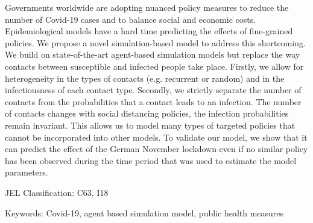 \noindent Governments worldwide are adopting nuanced policy measures to reduce the
number of Covid-19 cases and to balance social and economic costs. Epidemiological
models have a hard time predicting the effects of fine-grained policies. We propose a
novel simulation-based model to address this shortcoming. We build on state-of-the-art
agent-based simulation models but replace the way contacts between susceptible and
infected people take place. Firstly, we allow for heterogeneity in the types of contacts
(e.g. recurrent or random) and in the infectiousness of each contact type. Secondly, we
strictly separate the number of contacts from the probabilities that a contact leads to
an infection. The number of contacts changes with social distancing policies, the
infection probabilities remain invariant. This allows us to model many types of targeted
policies that cannot be incorporated into other models. To validate our model, we show
that it can predict the effect of the German November lockdown even if no similar policy
has been observed during the time period that was used to estimate the model parameters.

\vspace{1cm}
\noindent JEL Classification: C63, I18

\noindent Keywords: Covid-19, agent based simulation model, public health measures
